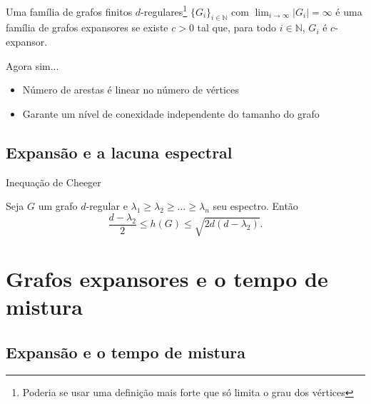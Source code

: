 \begin{frame}
  \begin{definition}
Uma família de grafos finitos $d$-regulares\footnote{Poderia se usar uma definição mais forte que só limita o grau dos vértices} $\{G_i\}_{i\in\mathbb{N}}$ com $\lim_{i\to\infty} |G_i| = \infty$ é uma família de grafos expansores se existe $c >0$ tal que, para todo $i\in\mathbb{N}$, $G_i$ é $c$-expansor.
\end{definition}

\end{frame}

\begin{frame}{Agora sim...}

  \begin{itemize}[<+-| alert@+>] 
    \item Número de arestas é linear no número de vértices 
    \item Garante um nível de conexidade independente do tamanho do grafo
  \end{itemize}
\end{frame}

\subsection{Expansão e a lacuna espectral}

\begin{frame}{Inequação de Cheeger}
\begin{theorem}
\label{thm:cheeger}
Seja $G$ um grafo $d$-regular e $\lambda_1\ge \lambda_2 \ge \dots \ge \lambda_n$ seu espectro. Então
\[
\frac{d-\lambda_2}{2}\leq h(G) \leq \sqrt{2d(d-\lambda_2)}.
\]
\end{theorem}
\vspace{10pt}
\end{frame}

\section{Grafos expansores e o tempo de mistura}

\subsection{Expansão e o tempo de mistura}

